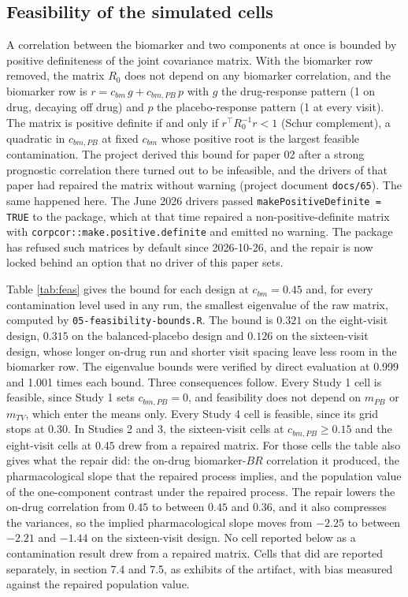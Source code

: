\documentclass[
  11pt,
]{article}
\begin{document}
\subsection{Feasibility of the simulated cells}\label{feasibility-of-the-simulated-cells}

A correlation between the biomarker and two components at once is bounded
by positive definiteness of the joint covariance matrix. With the
biomarker row removed, the matrix \(R_0\) does not depend on any biomarker
correlation, and the biomarker row is \(r = c_{bm}\,g + c_{bm,PB}\,p\) with
\(g\) the drug-response pattern (1 on drug, decaying off drug) and \(p\) the
placebo-response pattern (1 at every visit). The matrix is positive
definite if and only if \(r^{\top} R_0^{-1} r < 1\) (Schur complement), a
quadratic in \(c_{bm,PB}\) at fixed \(c_{bm}\) whose positive root is the
largest feasible contamination. The project derived this bound for paper
02 after a strong prognostic correlation there turned out to be
infeasible, and the drivers of that paper had repaired the matrix without
warning (project document \texttt{docs/65}). The same happened here. The
June 2026 drivers passed \texttt{makePositiveDefinite = TRUE} to the
package, which at that time repaired a non-positive-definite matrix with
\texttt{corpcor::make.positive.definite} and emitted no warning. The
package has refused such matrices by default since 2026-10-26, and the
repair is now locked behind an option that no driver of this paper sets.

Table \ref{tab:feas} gives the bound for each design at \(c_{bm} = 0.45\)
and, for every contamination level used in any run, the smallest
eigenvalue of the raw matrix, computed by
\texttt{05-feasibility-bounds.R}. The bound is \(0.321\)
on the eight-visit design, \(0.315\) on the
balanced-placebo design and \(0.126\) on the
sixteen-visit design, whose longer on-drug run and shorter visit spacing
leave less room in the biomarker row. The eigenvalue bounds were verified
by direct evaluation at 0.999 and 1.001 times each bound. Three
consequences follow. Every Study 1 cell is feasible, since Study 1 sets
\(c_{bm,PB} = 0\), and feasibility does not depend on \(m_{PB}\) or \(m_{TV}\),
which enter the means only. Every Study 4 cell is feasible, since its
grid stops at \(0.30\). In Studies 2 and 3, the sixteen-visit cells at
\(c_{bm,PB} \ge 0.15\) and the eight-visit cells at \(0.45\) drew from a
repaired matrix. For those cells the table also gives what the repair
did: the on-drug biomarker-\(BR\) correlation it produced, the
pharmacological slope that the repaired process implies, and the
population value of the one-component contrast under the repaired
process. The repair lowers the on-drug correlation from \(0.45\) to between
\(0.45\) and
\(0.36\), and it also
compresses the variances, so the implied pharmacological slope moves from
\(-2.25\) to between \(-2.21\)
and \(-1.44\) on the
sixteen-visit design. No cell reported below as a contamination result
drew from a repaired matrix. Cells that did are reported separately, in
section 7.4 and 7.5, as exhibits of the artifact, with bias measured
against the repaired population value.
\end{document}

